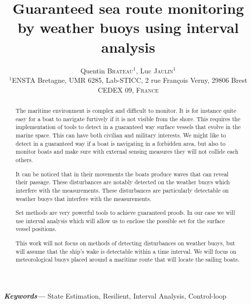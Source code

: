 \documentclass[a4paper]{article}
\title{Guaranteed sea route monitoring by weather buoys using interval analysis}
\author{Quentin \textsc{Brateau}$^{1}$, Luc \textsc{Jaulin}$^{1}$  \\
				\small $^{1}$ENSTA Bretagne, UMR 6285, Lab-STICC, 2 rue François Verny, 29806 Brest CEDEX 09, \textsc{France} \\
}
\date{}
\providecommand{\keywords}[1] {
	\small	
	\textbf{\textit{Keywords---}} #1
}
\begin{document}
	\maketitle

	\begin{abstract}

		The maritime environment is complex and difficult to monitor. It is for instance quite easy for a boat to navigate furtively if it is not visible from the shore. This requires the implementation of tools to detect in a guaranteed way surface vessels that evolve in the marine space. This can have both civilian and military interests. We might like to detect in a guaranteed way if a boat is navigating in a forbidden area, but also to monitor boats and make sure with external sensing measures they will not collide each others.
		
		It can be noticed that in their movements the boats produce waves that can reveal their passage. These disturbances are notably detected on the weather buoys which interfere with the measurements. These disturbances are particularly detectable on weather buoys that interfere with the measurements.

		Set methods are very powerful tools to achieve guaranteed proofs. In our case we will use interval analysis which will allow us to enclose the possible set for the surface vessel positions.

		This work will not focus on methods of detecting disturbances on weather buoys, but will assume that the ship's wake is detectable within a time interval. We will focus on meteorological buoys placed around a maritime route that will locate the sailing boats. 
		
	\end{abstract}

	\hspace{10pt}

	\keywords{State Estimation, Resilient, Interval Analysis, Control-loop}

	
	
\end{document}
